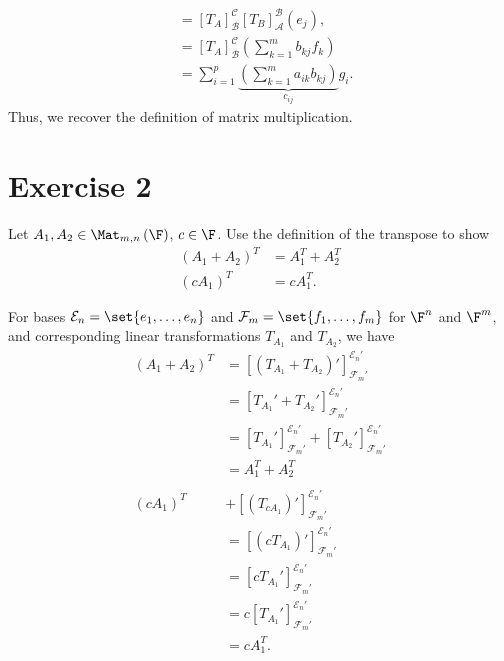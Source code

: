 \documentclass[12pt]{mypackage}
\begin{document}
\begin{solution}
\begin{enumerate}[(1)]
\begin{align*}
                                                                               &= \left[T_A\right]_{\mathcal{B}}^{\mathcal{C}}\left[T_B\right]_{\mathcal{A}}^{\mathcal{B}}\left(e_j\right),\\
                                                                               &= \left[T_A\right]_{\mathcal{B}}^{\mathcal{C}}\left(\sum_{k=1}^{m}b_{kj}f_k\right)\\
                                                                               &= \sum_{i=1}^{p}\underbrace{\left(\sum_{k=1}^{m}a_{ik}b_{kj}\right)}_{c_{ij}}g_i.
      \end{align*}
      Thus, we recover the definition of matrix multiplication.
  \end{enumerate}
\end{solution}
\section{Exercise 2}%
\begin{problem}
  Let $A_1,A_2\in \Mat_{m,n}\left(\F\right)$, $c\in \F$. Use the definition of the transpose to show
  \begin{align*}
    \left(A_1 + A_2\right)^{T} &= A_1^T + A_2^T\\
    \left(cA_1\right)^T &= cA_1^T.
  \end{align*}
\end{problem}
\begin{solution}
  For bases $\mathcal{E}_n = \set{e_1,\dots,e_n}$ and $\mathcal{F}_m = \set{f_1,\dots,f_m}$ for $\F^n$ and $\F^m$, and corresponding linear transformations $T_{A_1}$ and $T_{A_2}$, we have
  \begin{align*}
    \left(A_1 + A_2\right)^{T} &= \left[\left(T_{A_1} + T_{A_2}\right)'\right]_{\mathcal{F}_{m}'}^{\mathcal{E}_{n}'}\\
                               &= \left[T_{A_1}' + T_{A_2}'\right]_{\mathcal{F}_m'}^{\mathcal{E}_n'}\\
                               &= \left[T_{A_1}'\right]_{\mathcal{F}_m'}^{\mathcal{E}_n'} + \left[T_{A_2}'\right]_{\mathcal{F}_m'}^{\mathcal{E}_n'}\\
                               &= A_{1}^{T} + A_2^T\\
                               \\
    \left(cA_1\right)^{T} &+ \left[\left(T_{cA_1}\right)'\right]_{\mathcal{F}_m'}^{\mathcal{E}_n'}\\
                          &= \left[\left(cT_{A_1}\right)'\right]_{\mathcal{F}_m'}^{\mathcal{E}_n'}\\
                          &= \left[cT_{A_1}'\right]_{\mathcal{F}_m'}^{\mathcal{E}_n'}\\
                          &= c\left[T_{A_1}'\right]_{\mathcal{F}_m'}^{\mathcal{E}_n'}\\
                          &= cA_{1}^{T}.
  \end{align*}
\end{solution}
\end{document}
